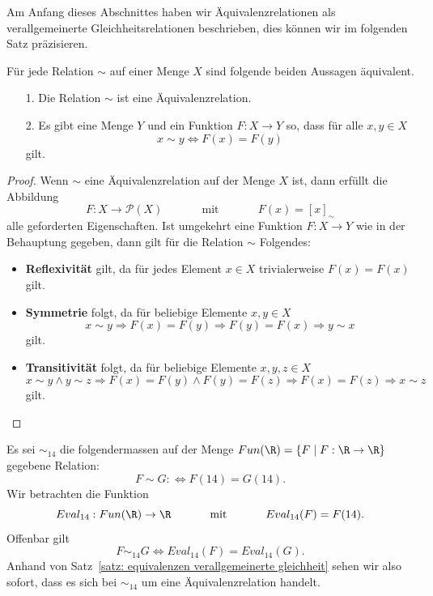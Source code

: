 Am Anfang dieses Abschnittes haben wir Äquivalenzrelationen als verallgemeinerte Gleichheitsrelationen beschrieben, dies können wir im folgenden Satz präzisieren.

\begin{satz}\label{satz: equivalenzen verallgemeinerte gleichheit}
Für jede Relation $\sim$ auf einer Menge $X$ sind folgende beiden Aussagen äquivalent.
\begin{enumerate}
\item[1.] Die Relation $\sim$ ist eine Äquivalenzrelation.
\item[2.] Es gibt eine Menge $Y$ und ein Funktion $F:X\to Y$ so, dass für alle $x,y\in X$
\[
x\sim y\Leftrightarrow F(x)=F(y)
\]
gilt.
\end{enumerate}
\end{satz}
\begin{proof}
Wenn $\sim$ eine Äquivalenzrelation auf der Menge $X$ ist, dann erfüllt die Abbildung
\[
F:X\to\mathcal{P}(X)\phantom{abstand}\text{mit} \phantom{abstand} F(x)=[x]_\sim
\]
alle geforderten Eigenschaften. Ist umgekehrt eine Funktion $F:X\to Y$ wie in der Behauptung gegeben, dann gilt für die Relation $\sim$ Folgendes:
\begin{itemize}
\item\textbf{Reflexivität} gilt, da für jedes Element $x\in X$ trivialerweise $F(x)=F(x)$ gilt.
\item \textbf{Symmetrie} folgt, da für beliebige Elemente $x,y\in X$
\[
x\sim y\Rightarrow F(x)=F(y)\Rightarrow F(y)=F(x)\Rightarrow y\sim x
\]
gilt.
\item\textbf{Transitivität} folgt, da für beliebige Elemente $x,y,z\in X$
\[
x\sim y\land y\sim z\Rightarrow F(x)=F(y)\land F(y)=F(z)\Rightarrow F(x)=F(z)\Rightarrow  x\sim z
\]
gilt.
\end{itemize}
\end{proof}



\begin{bsp}
Es sei $\sim_{14}$ die folgendermassen auf der Menge $Fun(\R)=\{F\mid F:\R\to\R\}$ gegebene Relation:
\[
F\sim G:\Leftrightarrow F(14)=G(14).
\]
Wir betrachten die Funktion
\[
Eval_{14}:Fun(\R)\to \R\phantom{abstand}\text{mit}\phantom{abstand}Eval_{14}(F)=F(14).
\]
Offenbar gilt
\[
F\sim_{14}G\Leftrightarrow Eval_{14}(F)=Eval_{14}(G).
\]
Anhand von Satz~\ref{satz: equivalenzen verallgemeinerte gleichheit} sehen wir also sofort, dass es sich bei $\sim_{14}$ um eine Äquivalenzrelation handelt.
\end{bsp}

